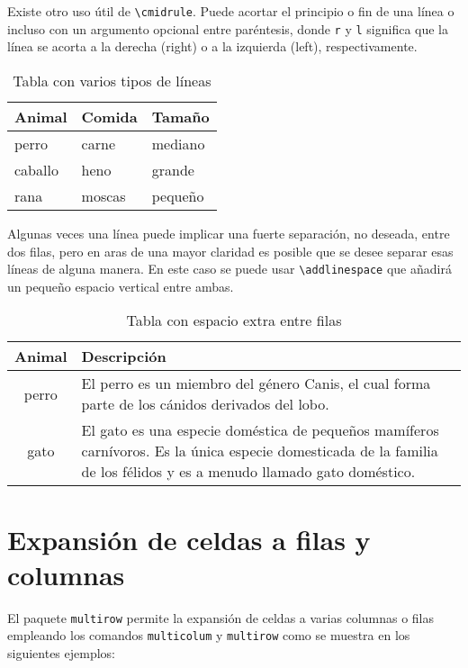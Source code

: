 \documentclass[11pt,a4paper]{article}
\begin{document}
Existe otro uso útil de \texttt{\textbackslash cmidrule}. Puede acortar el principio o fin de una línea o incluso con un argumento opcional entre paréntesis, donde \texttt{r} y \texttt{l} significa que la línea se acorta a la derecha (right) o a la izquierda (left), respectivamente.

\begin{table}[H]
   \centering
   	  \caption{Tabla con varios tipos de líneas}
   	  \label{tab:cmidrule}      
    \begin{tabular}{lll}
      \toprule
      Animal  & Comida & Tamaño  \\
      \midrule
      perro   & carne  & mediano \\
      \cmidrule{1-2}
      caballo & heno   & grande  \\
      \cmidrule(r){1-1}
      \cmidrule(rl){2-2}
      \cmidrule(l){3-3}
      rana    & moscas & pequeño \\
      \bottomrule
    \end{tabular}
\end{table}

Algunas veces una línea puede implicar una fuerte separación, no deseada, entre dos filas, pero en aras de una mayor claridad es posible que se desee separar esas líneas de alguna manera. En este caso se puede usar \texttt{\textbackslash addlinespace} que añadirá un pequeño espacio vertical entre ambas.

\begin{table}[H]
   \centering
   	  \caption{Tabla con espacio extra entre filas}
   	  \label{tab:espace}      
    \begin{tabular}{cp{9cm}}
      \toprule
      Animal & Descripción \\
      \midrule
      perro  & El perro es un miembro del género Canis, el cual forma parte 
               de los cánidos derivados del lobo. \\
      \addlinespace
      gato   & El gato es una especie doméstica de pequeños mamíferos carnívoros. Es la 
               única especie domesticada de la familia de los félidos y es a menudo llamado 
    		   gato doméstico. \\
      \bottomrule
    \end{tabular}
\end{table}






\section{Expansión de celdas a filas y columnas}
El paquete \texttt{multirow} permite la expansión de celdas a varias columnas o filas empleando los comandos \texttt{multicolum} y \texttt{multirow} como se muestra en los siguientes ejemplos:
\end{document}

